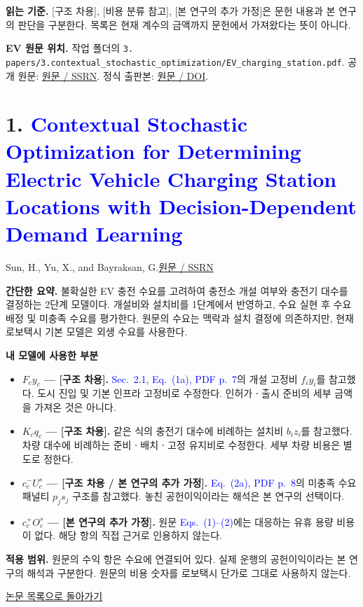 \documentclass[10pt,a4paper]{article}
\newcommand{\evtitle}{Contextual Stochastic Optimization for Determining Electric Vehicle Charging Station Locations with Decision-Dependent Demand Learning}
\newcommand{\backtolist}{\par\smallskip\hyperlink{paper:list}{논문 목록으로 돌아가기}\par}
\begin{document}
\textbf{읽는 기준.} [구조 차용], [비용 분류 참고], [본 연구의 추가 가정]은 문헌 내용과 본 연구의 판단을 구분한다. 목록은 현재 계수의 금액까지 문헌에서 가져왔다는 뜻이 아니다.

\textbf{EV 원문 위치.} 작업 폴더의 \texttt{3. papers/3.contextual\_stochastic\_optimization/EV\_charging\_station.pdf}. 공개 원문: \href{https://papers.ssrn.com/sol3/papers.cfm?abstract_id=5078715}{원문 / SSRN}. 정식 출판본: \href{https://doi.org/10.1016/j.trb.2026.103524}{원문 / DOI}.

\newpage
\hypertarget{paper:ev}{}
\section*{1. \textcolor{blue}{\evtitle}}
{\color{blue}Sun, H., Yu, X., and Bayraksan, G.\quad \href{https://papers.ssrn.com/sol3/papers.cfm?abstract_id=5078715}{원문 / SSRN}}

\textbf{간단한 요약.} 불확실한 EV 충전 수요를 고려하여 충전소 개설 여부와 충전기 대수를 결정하는 2단계 모델이다. 개설비와 설치비를 1단계에서 반영하고, 수요 실현 후 수요 배정 및 미충족 수요를 평가한다. 원문의 수요는 맥락과 설치 결정에 의존하지만, 현재 로보택시 기본 모델은 외생 수요를 사용한다.

\textbf{내 모델에 사용한 부분}
\begin{itemize}
\item \textbf{$F_cy_c$ --- [구조 차용].} \textcolor{blue}{Sec.~2.1, Eq.~(1a), PDF p.~7}의 개설 고정비 $f_i y_i$를 참고했다. 도시 진입 및 기본 인프라 고정비로 수정한다. 인허가ㆍ출시 준비의 세부 금액을 가져온 것은 아니다.
\item \textbf{$K_cq_c$ --- [구조 차용].} 같은 식의 충전기 대수에 비례하는 설치비 $b_i z_i$를 참고했다. 차량 대수에 비례하는 준비ㆍ배치ㆍ고정 유지비로 수정한다. 세부 차량 비용은 별도로 정한다.
\item \textbf{$c_c^-U_c^s$ --- [구조 차용 / 본 연구의 추가 가정].} \textcolor{blue}{Eq.~(2a), PDF p.~8}의 미충족 수요 패널티 $p_j s_j$ 구조를 참고했다. 놓친 공헌이익이라는 해석은 본 연구의 선택이다.
\item \textbf{$c_c^+O_c^s$ --- [본 연구의 추가 가정].} 원문 \textcolor{blue}{Eqs.~(1)--(2)}에는 대응하는 유휴 용량 비용이 없다. 해당 항의 직접 근거로 인용하지 않는다.
\end{itemize}
\textbf{적용 범위.} 원문의 수익 항은 수요에 연결되어 있다. 실제 운행의 공헌이익이라는 본 연구의 해석과 구분한다. 원문의 비용 숫자를 로보택시 단가로 그대로 사용하지 않는다.
\backtolist

\hypertarget{paper:bosch}{}
\end{document}

